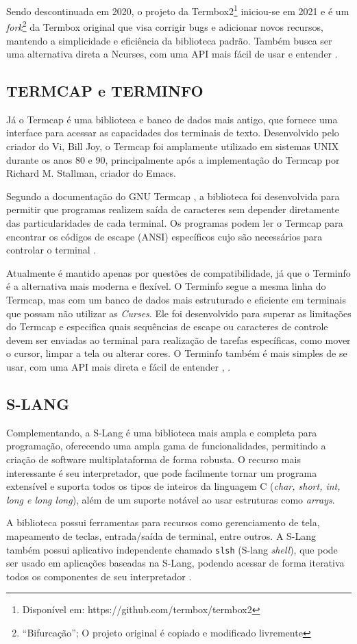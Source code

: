 Sendo descontinuada em 2020, o projeto da Termbox2\footnote{Disponível em: https://github.com/termbox/termbox2} iniciou-se em 2021 e é um \textit{fork}\footnote{``Bifurcação''; O projeto original é copiado e modificado livremente} da Termbox original que visa corrigir bugs e adicionar novos recursos, mantendo a simplicidade e eficiência da biblioteca padrão. Também busca ser uma alternativa direta a Ncurses, com uma API mais fácil de usar e entender \cite{termbox2_github}.

\subsection{TERMCAP e TERMINFO}

Já o Termcap é uma biblioteca e banco de dados mais antigo, que fornece uma interface para acessar as capacidades dos terminais de texto. Desenvolvido pelo criador do Vi, Bill Joy, o Termcap foi amplamente utilizado em sistemas UNIX durante os anos 80 e 90, principalmente após a implementação do Termcap por Richard M. Stallman, criador do Emacs.

Segundo a documentação do GNU Termcap \cite{stallman_termcap}, a biblioteca foi desenvolvida para permitir que programas realizem saída de caracteres sem depender diretamente das particularidades de cada terminal. Os programas podem ler o Termcap para encontrar os códigos de escape (ANSI) específicos cujo são necessários para controlar o terminal \cite{kerrisk_termcap_man7}.

Atualmente é mantido apenas por questões de compatibilidade, já que o Terminfo é a alternativa mais moderna e flexível. O Terminfo segue a mesma linha do Termcap, mas com um banco de dados mais estruturado e eficiente em terminais que possam não utilizar as \textit{Curses}. Ele foi desenvolvido para superar as limitações do Termcap e especifica quais sequências de escape ou caracteres de controle devem ser enviadas ao terminal para realização de tarefas específicas, como mover o cursor, limpar a tela ou alterar cores. O Terminfo também é mais simples de se usar, com uma API mais direta e fácil de entender \cite{man7_terminfo}, \cite{tldp_text_terminal_howto}.

\subsection{S-LANG}

Complementando, a S-Lang é uma biblioteca mais ampla e completa para programação, oferecendo uma ampla gama de funcionalidades, permitindo a criação de software multiplataforma de forma robusta. O recurso mais interessante é seu interpretador, que pode facilmente tornar um programa extensível e suporta todos os tipos de inteiros da linguagem C (\textit{char, short, int, long e long long}), além de um suporte notável ao usar estruturas como \textit{arrays}.

A biblioteca possui ferramentas para recursos como gerenciamento de tela, mapeamento de teclas, entrada/saída de terminal, entre outros. A S-Lang também possui aplicativo independente chamado \texttt{slsh} (S-lang \textit{shell}), que pode ser usado em aplicações baseadas na S-Lang, podendo acessar de forma iterativa todos os componentes de seu interpretador \cite{Davis2022S_Lang}.